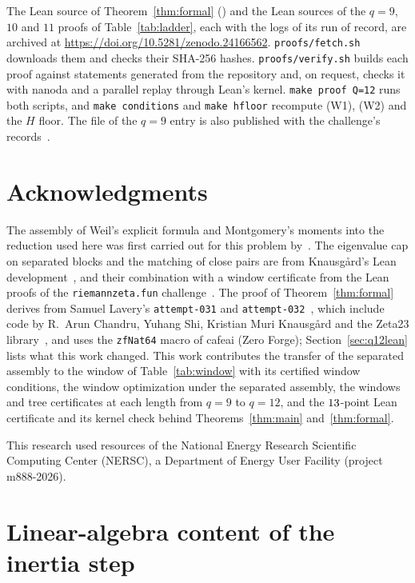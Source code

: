 \documentclass[11pt]{article}
\theoremstyle{definition}
\begin{document}
The Lean source of Theorem~\ref{thm:formal} (\qSource) and the Lean sources of
the $q=9$, $10$ and $11$ proofs of Table~\ref{tab:ladder}, each with the logs of its run of
record, are archived at \url{https://doi.org/10.5281/zenodo.24166562}. \texttt{proofs/fetch.sh}
downloads them and checks their SHA-256 hashes. \texttt{proofs/verify.sh} builds each proof
against statements generated from the repository and, on request, checks it with nanoda and a
parallel replay through Lean's kernel. \texttt{make proof Q=12} runs both scripts, and
\texttt{make conditions} and \texttt{make hfloor} recompute (W1), (W2) and the $H$ floor. The file of the $q=9$ entry is also published
with the challenge's records~\cite{RZF26}.

\section*{Acknowledgments}
The assembly of Weil's explicit formula and Montgomery's moments into the
reduction used here was first carried out for this problem by~\cite{AF26}. The
eigenvalue cap on separated blocks and the matching of close pairs are from
Knausg\aa rd's Lean development~\cite{Kna26}, and their combination with a
window certificate from the Lean proofs of the \texttt{riemannzeta.fun}
challenge~\cite{RZF26}. The proof of Theorem~\ref{thm:formal} derives from
Samuel Lavery's \texttt{attempt-031} and \texttt{attempt-032}~\cite{Lav26},
which include code by R.~Arun Chandru, Yuhang Shi, Kristian Muri Knausg\aa rd
and the Zeta23 library~\cite{Zeta23Lean}, and uses the \texttt{zfNat64} macro
of cafeai (Zero Forge); Section~\ref{sec:q12lean} lists what this work
changed. This work contributes the transfer of the separated assembly
to the window of Table~\ref{tab:window} with its certified window conditions,
the window optimization under the separated assembly, the windows and tree
certificates at each length from $q=9$ to $q=12$, and the $13$-point Lean
certificate and its kernel check behind Theorems~\ref{thm:main}
and~\ref{thm:formal}.

This research used resources of the National Energy Research Scientific
Computing Center (NERSC), a Department of Energy User Facility (project
m888-2026).

\appendix
\section{Linear-algebra content of the inertia step}\label{app:inertia}
\end{document}
